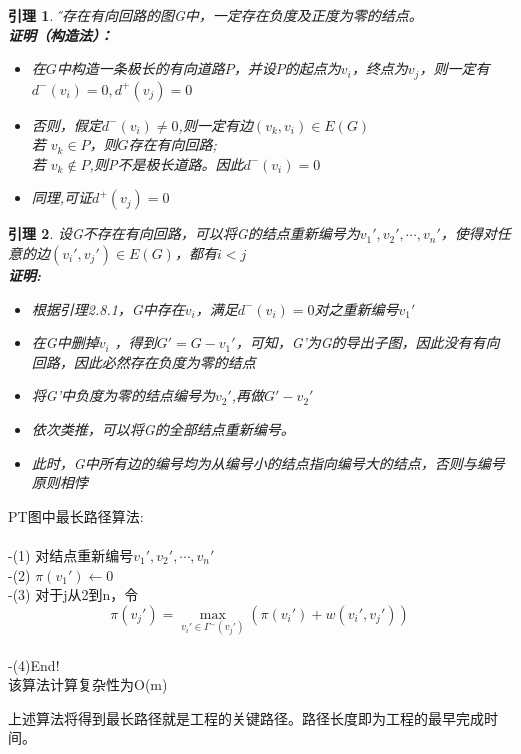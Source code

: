 \documentclass[11pt,a4paper,openany]{book}
\newtheorem{lemma}{\textbf{引理}}[section]
\begin{document}
\begin{lemma}\H
不存在有向回路的图G中，一定存在负度及正度为零的结点。\\
\textbf{证明（构造法）：}\\
\begin{itemize}
  \item[-] 在$G$中构造一条极长的有向道路$P$，并设$P$的起点为$v_i$，终点为$v_j$，则一定有$d^{-}(v_i)=0,d^{+}(v_j)=0$
  \item[-] 否则，假定$d^{-}(v_i)\neq 0$,则一定有边$(v_k,v_i)\in E(G)$\\
  若 $v_k\in P$，则$G$存在有向回路;\\
  若 $v_k \notin P$,则P不是极长道路。因此$d^{-}(v_i)=0$
  \item[-] 同理,可证$d^{+}(v_j)=0$
\end{itemize}
\end{lemma}
\begin{lemma}
设G不存在有向回路，可以将G的结点重新编号为$v_1',v_2',\cdots,v_n'$，使得对任意的边$(v_i',v_j')\in E(G)$，都有$i<j$\\
\textbf{证明:}\\
\begin{itemize}
  \item[-] 根据引理2.8.1，G中存在$v_i$，满足$d^{-}(v_i)=0$对之重新编号$v_1'$
  \item[-] 在G中删掉$v_i$ ，得到$G'=G-v_1'$，可知，G’为G的导出子图，因此没有有向回路，因此必然存在负度为零的结点
  \item[-] 将G'中负度为零的结点编号为$v_2'$,再做$G'-v_2'$
  \item[-] 依次类推，可以将G的全部结点重新编号。
  \item[-] 此时，G中所有边的编号均为从编号小的结点指向编号大的结点，否则与编号原则相悖
\end{itemize}
\end{lemma}
\begin{shaded}
PT图中最长路径算法:\\
\\
-(1) 对结点重新编号$v_1',v_2',\cdots,v_n'$\\
-(2) $\pi(v_1')\leftarrow 0$\\
-(3) 对于j从2到n，令$$\pi(v_j')=\mathop{max}\limits_{v_i'\in \Gamma^{-}(v_j')}(\pi(v_i')+w(v_i',v_j'))$$\\
-(4)End!\\
该算法计算复杂性为O(m)\\
\end{shaded}
\indent 上述算法将得到最长路径就是工程的关键路径。\textcolor[rgb]{1.00,0.00,0.00}{路径长度即为工程的最早完成时间}。\\
\end{document}
